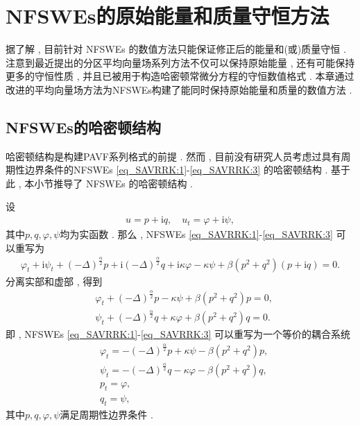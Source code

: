 \chapter[NFSWEs的原始能量和质量守恒方法]{NFSWEs的原始能量和质量守恒方法}
据了解 , 目前针对 NFSWEs 的数值方法只能保证修正后的能量和(或)质量守恒 . 
注意到最近提出的分区平均向量场系列方法不仅可以保持原始能量 , 还有可能保持更多的守恒性质 , 并且已被用于构造哈密顿常微分方程的守恒数值格式\cite{caiPartitionedAveragedVector2018} . 
本章通过改进的平均向量场方法为NFSWEs构建了能同时保持原始能量和质量的数值方法 . 
\section{NFSWEs的哈密顿结构}\label{Section_PAVF: 2_1}

哈密顿结构是构建PAVF系列格式的前提 . 然而 , 目前没有研究人员考虑过具有周期性边界条件的NFSWEs \eqref{eq_SAVRRK:1}-\eqref{eq_SAVRRK:3} 的哈密顿结构 . 
基于此 , 本小节推导了 NFSWEs 的哈密顿结构 . 

设
\begin{align}
u = p+\mathrm{i}q , \quad u_t = \varphi+ \mathrm{i}\psi , 
\end{align}
其中$p , q , \varphi , \psi$均为实函数 . 那么 , NFSWEs \eqref{eq_SAVRRK:1}-\eqref{eq_SAVRRK:3} 可以重写为
\begin{align}\label{eq_PAVF:28}
\varphi_{t}+\mathrm{i}\psi_{t}+\left( -\Delta \right) ^{\frac{\alpha }{2}}p+\mathrm{i}\left( -\Delta \right) ^{\frac{\alpha }{2}}q+\mathrm{i}\kappa \varphi-\kappa \psi+\beta \left( p^{2}+q^{2}\right) \left( p+\mathrm{i} q\right) =0 . 
\end{align}
分离实部和虚部 , 得到
\begin{align}
&\varphi_{t}+\left( -\Delta \right) ^{\frac{\alpha }{2}}p-\kappa \psi+\beta \left( p^{2}+q^{2}\right)p=0 , \nonumber\\
&\psi_{t}+\left( -\Delta \right) ^{\frac{\alpha }{2}}q+\kappa \varphi+\beta \left( p^{2}+q^{2}\right)q=0 . \label{eq_PAVF:29}
\end{align}
即 , NFSWEs \eqref{eq_SAVRRK:1}-\eqref{eq_SAVRRK:3} 可以重写为一个等价的耦合系统
\begin{align}
&\varphi_{t}=-\left( -\Delta \right) ^{\frac{\alpha }{2}}p+\kappa \psi-\beta \left( p^{2}+q^{2}\right)p\label{eq_PAVF:30} , \\
&\psi_{t}=-\left( -\Delta \right) ^{\frac{\alpha }{2}}q-\kappa \varphi-\beta \left( p^{2}+q^{2}\right)q\label{eq_PAVF:31} , \\
&p_t=\varphi , \label{eq_PAVF:32}\\
&q_t=\psi , \label{eq_PAVF:33}
\end{align}
其中$p , q , \varphi , \psi$满足周期性边界条件 . 

